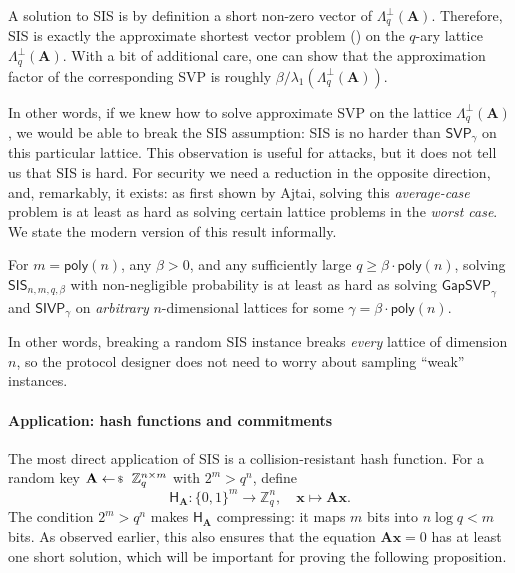\documentclass[../../book.tex]{subfiles}
\begin{document}
A solution to SIS is by definition a short non-zero vector of $\Lambda^{\perp}_q(\mathbf{A})$.
Therefore, SIS is exactly the approximate shortest vector problem () on the $q$-ary lattice $\Lambda^{\perp}_q(\mathbf{A})$. 
With a bit of additional care, one can show that the approximation factor of the corresponding SVP is roughly $\beta/\lambda_1(\Lambda^{\perp}_q(\mathbf{A}))$.

In other words, if we knew how to solve approximate SVP on the lattice $\Lambda^{\perp}_q(\mathbf{A})$, we would be able to break the SIS assumption: SIS is no harder than $\mathsf{SVP}_{\gamma}$ on this particular lattice.
This observation is useful for attacks, but it does not tell us that SIS is hard.
For security we need a reduction in the opposite direction, and, remarkably, it exists: as first shown by Ajtai, solving this \emph{average-case} problem is at least as hard as solving certain lattice problems in the \emph{worst case}.
We state the modern version of this result informally.

\begin{theorem}\label{thm:sis-worst-case}
    For $m = \mathsf{poly}(n)$, any $\beta > 0$, and any sufficiently large $q \geq \beta \cdot \mathsf{poly}(n)$, solving $\mathsf{SIS}_{n,m,q,\beta}$ with non-negligible probability is at least as hard as solving $\mathsf{GapSVP}_{\gamma}$ and $\mathsf{SIVP}_{\gamma}$ on \emph{arbitrary} $n$-dimensional lattices for some $\gamma = \beta \cdot \mathsf{poly}(n)$.
\end{theorem}

In other words, breaking a random SIS instance breaks \emph{every} lattice of dimension $n$, so the protocol designer does not need to worry about sampling ``weak'' instances.

\paragraph{Application: hash functions and commitments}
The most direct application of SIS is a collision-resistant hash function.
For a random key $\mathbf{A} \leftarrowS \mathbb{Z}_q^{n \times m}$ with $2^m > q^n$, define
\begin{equation*}
    \mathsf{H}_{\mathbf{A}}: \{0,1\}^m \to \mathbb{Z}_q^n, \quad \mathbf{x} \mapsto \mathbf{A}\mathbf{x}.
\end{equation*}
The condition $2^m > q^n$ makes $\mathsf{H}_{\mathbf{A}}$ compressing: it maps $m$ bits into $n\log q < m$ bits.
As observed earlier, this also ensures that the equation $\mathbf{Ax}=0$ has at least one short solution, which will be important for proving the following proposition.
\end{document}
